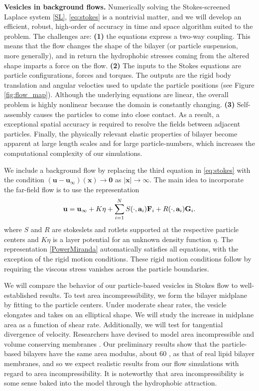 \textbf{Vesicles in background flows.}
Numerically solving the Stokes-screened Laplace system \eqref{SL}, \eqref{eq:stokes} is a nontrivial matter,
and we will develop an efficient, robust, high-order of accuracy in time and space algorithm suited to the problem. 
The challenges are: \textbf{(1)} the equations express a two-way coupling.
This means that the flow changes the shape of the bilayer (or particle suspension, more generally),
and in return the hydrophobic stresses coming from the altered shape imparts a force on the flow. 
\textbf{(2)}
The inputs to the Stokes equations are particle configurations, forces and torques. 
The outputs are the rigid body translation and angular velocties used to update the particle positions (see Figure \ref{fig:flow_map}).
Although the underlying equations are linear, the overall problem is highly nonlinear because the domain is constantly changing.
\textbf{(3)} Self-assembly causes the particles to come into close contact.  
As a result, a exceptional spatial accuracy is required to resolve the fields between adjacent particles.
Finally, the physically relevant elastic properties of bilayer become apparent at large length scales and for large particle-numbers,
which increases the computational complexity of our simulations. 

We include a background flow by replacing the third equation in \eqref{eq:stokes} with the condition
$(\mathbf{u} - \mathbf{u}_{\infty})(\mathbf{x}) \to \mathbf{0}$ as $|\mathbf{x}| \to \infty.$ 
The main idea to incorporate the far-field flow is to use the representation 
\begin{equation}
\label{PowerMiranda}
{\bf u} = {\bf u}_{\infty} + K\eta + \sum_{i=1}^N S(\cdot, {\bf a}_i) {\bf F}_i + R(\cdot, {\bf a}_i) {\bf G}_i.
\end{equation}
where $S$ and $R$ are stokeslets and rotlets supported at the respective particle centers 
and $K\eta$ is a layer potential for an unknown density function $\eta.$ 
The representation \eqref{PowerMiranda} automatically satisfies all equations, with the exception of the rigid motion conditions. 
These rigid motion conditions follow by requiring the viscous stress vanishes across the particle boundaries.

We will compare the behavior of our particle-based vesicles in Stokes flow to well-established results.
To test area incompressibility, we form the bilayer midplane by fitting to the particle centers. Under moderate shear rates,
the vesicle elongates and takes on an elliptical shape. We will study the increase in midplane area as a function of shear rate.
Additionally, we will test for tangential divergence of velocity.
Researchers have devised to model area incompressible and
volume conserving membranes
\cite{torres-sanchez_millan_arroyo_2019, mahapatra_saintillan_rangamani_2020, Steigmann99, C6SM02452A}.
Our preliminary results show that the particle-based bilayers have the same area modulus, about 60 \kBT,  as that of real lipid bilayer membranes,
and so we expect realistic results from our flow simulations with regard to area incompressibility.  It is noteworthy that
area incompressibility is some sense baked into the model through the hydrophobic attraction. 

